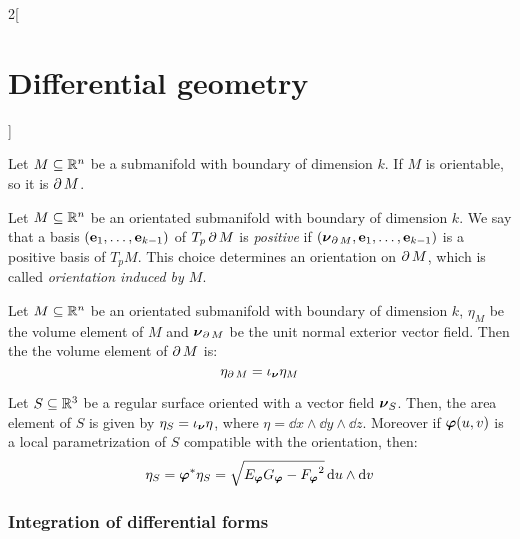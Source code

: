 \documentclass[../../../main.tex]{subfiles}
\begin{document}
\begin{multicols}{2}[\section{Differential geometry}]
\begin{definition}
  \end{definition}
  \begin{proposition}
    Let $M\subseteq\mathbb{R}^n$ be a submanifold with boundary of dimension $k$. If $M$ is orientable, so it is $\operatorname{\partial}{M}$.
  \end{proposition}
  \begin{definition}
    Let $M\subseteq\mathbb{R}^n$ be an orientated submanifold with boundary of dimension $k$. We say that a basis $(\boldsymbol{\mathrm{e}}_1,\ldots,\boldsymbol{\mathrm{e}}_{k-1})$ of $T_p\operatorname{\partial}{M}$ is \emph{positive} if $(\boldsymbol{\mathrm{\nu}}_{\operatorname{\partial}{M}},\boldsymbol{\mathrm{e}}_1,\ldots,\boldsymbol{\mathrm{e}}_{k-1})$ is a positive basis of $T_pM$. This choice determines an orientation on $\operatorname{\partial}{M}$, which is called \emph{orientation induced by $M$}.
  \end{definition}
  \begin{proposition}
    Let $M\subseteq\mathbb{R}^n$ be an orientated submanifold with boundary of dimension $k$, $\eta_M$ be the volume element of $M$ and $\boldsymbol{\mathrm{\nu}}_{\operatorname{\partial}{M}}$ be the unit normal exterior vector field. Then the the volume element of $\operatorname{\partial}{M}$ is: $$\eta_{\operatorname{\partial}{M}}=\iota_{\boldsymbol{\mathrm{\nu}}}\eta_M$$
  \end{proposition}
  \begin{proposition}
    Let $S\subseteq\mathbb{R}^3$ be a regular surface oriented with a vector field $\boldsymbol{\mathrm{\nu}}_S$. Then, the area element of $S$ is given by $\eta_S=\iota_{\boldsymbol{\mathrm{\nu}}}\eta$, where $\eta=\dd{x}\wedge\dd{y}\wedge\dd{z}$. Moreover if $\boldsymbol{\mathrm{\varphi}}(u,v)$ is a local parametrization of $S$ compatible with the orientation, then: $$\eta_S=\boldsymbol{\mathrm{\varphi}}^*\eta_S=\sqrt{E_{\boldsymbol{\mathrm{\varphi}}}G_{\boldsymbol{\mathrm{\varphi}}}-{F_{\boldsymbol{\mathrm{\varphi}}}}^2}\dd{u}\wedge\dd{v}$$
  \end{proposition}
  \subsubsection{Integration of differential forms}
\end{multicols}
\end{document}
